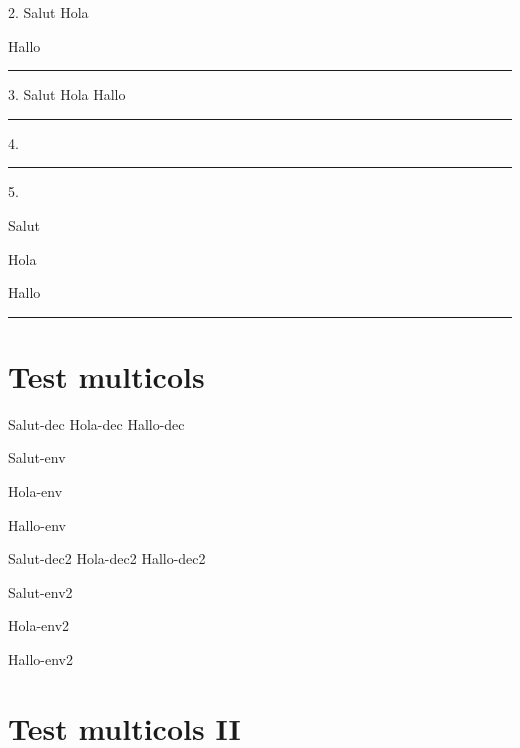 \documentclass{article}
\begin{document}
2. {\fr Salut} {\es Hola} {{\de Hallo}

\bigskip\hrule\bigskip

3. {\fr Salut \es Hola \de Hallo \zz}

\bigskip\hrule\bigskip

4.   

\bigskip\hrule\bigskip

5.%
\begin{francais}
Salut
\end{francais}%
\begin{espanol}%
Hola
\end{espanol}%
\begin{deutsch}%
Hallo
\end{deutsch}

\bigskip\hrule\bigskip

\section{Test multicols}

\multicolson
\begin{multicols}

\fr Salut-dec \es Hola-dec \de Hallo-dec \zz

   

\begin{francais}
Salut-env
\end{francais}
\begin{espanol}
Hola-env
\end{espanol}
\begin{deutsch}
Hallo-env
\end{deutsch}

\fr Salut-dec2 \es Hola-dec2 \de Hallo-dec2 \zz

   

\begin{francais}
Salut-env2
\end{francais}
\begin{espanol}
Hola-env2
\end{espanol}
\begin{deutsch}
Hallo-env2
\end{deutsch}

\end{multicols}

\section{Test multicols II}

}
\end{document}
